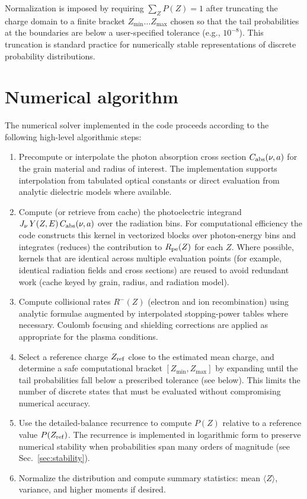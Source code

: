 \documentclass{article}
\begin{document}
Normalization is imposed by requiring $\sum_Z P(Z)=1$ after truncating the
charge domain to a finite bracket $Z_{\min}\ldots Z_{\max}$ chosen so that
the tail probabilities at the boundaries are below a user-specified tolerance
(e.g., $10^{-8}$). This truncation is standard practice for numerically
stable representations of discrete probability distributions.

\section{Numerical algorithm}
The numerical solver implemented in the code proceeds according to the
following high-level algorithmic steps:
\begin{enumerate}
  \item Precompute or interpolate the photon absorption cross section
    $C_{\rm abs}(\nu,a)$ for the grain material and radius of interest. The
    implementation supports interpolation from tabulated optical constants or
    direct evaluation from analytic dielectric models where available.
  \item Compute (or retrieve from cache) the photoelectric integrand
    $J_{\nu}\,Y(Z,E)\,C_{\rm abs}(\nu,a)$ over the radiation bins. For
    computational efficiency the code constructs this kernel in vectorized
    blocks over photon-energy bins and integrates (reduces) the contribution
    to $R_{\rm pe}(Z)$ for each $Z$. Where possible, kernels that are
    identical across multiple evaluation points (for example, identical
    radiation fields and cross sections) are reused to avoid redundant work
    (cache keyed by grain, radius, and radiation model).
  \item Compute collisional rates $R^{-}(Z)$ (electron and ion recombination)
    using analytic formulae augmented by interpolated stopping-power tables
    where necessary. Coulomb focusing and shielding corrections are applied as
    appropriate for the plasma conditions.
  \item Select a reference charge $Z_{\rm ref}$ close to the estimated mean
    charge, and determine a safe computational bracket $[Z_{\min},Z_{\max}]$
    by expanding until the tail probabilities fall below a prescribed
    tolerance (see below). This limits the number of discrete states that
    must be evaluated without compromising numerical accuracy.
  \item Use the detailed-balance recurrence to compute $P(Z)$ relative to a
    reference value $P(Z_{\rm ref})$. The recurrence is implemented in
    logarithmic form to preserve numerical stability when probabilities span
    many orders of magnitude (see Sec.~\ref{sec:stability}).
  \item Normalize the distribution and compute summary statistics: mean
    $\langle Z\rangle$, variance, and higher moments if desired.
\end{enumerate}
\end{document}
